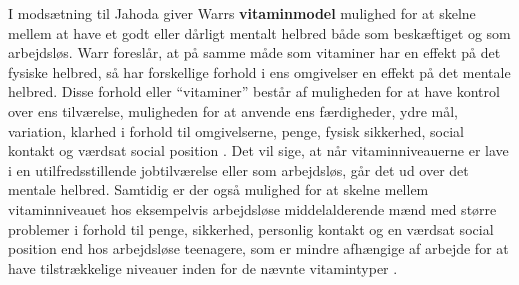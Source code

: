 I modsætning til Jahoda giver Warrs \textbf{vitaminmodel} mulighed for at skelne mellem at have et godt eller dårligt mentalt helbred både som beskæftiget og som arbejdsløs. Warr foreslår, at på samme måde som vitaminer har en effekt på det fysiske helbred, så har forskellige forhold i ens omgivelser en effekt på det mentale helbred. Disse forhold eller “vitaminer” består af muligheden for at have kontrol over ens tilværelse, muligheden for at anvende ens færdigheder, ydre mål, variation, klarhed i forhold til omgivelserne, penge, fysisk sikkerhed, social kontakt og værdsat social position \parencite[45]{Ezzy1993}. Det vil sige, at når vitaminniveauerne er lave i en utilfredsstillende jobtilværelse eller som arbejdsløs, går det ud over det mentale helbred. Samtidig er der også mulighed for at skelne mellem vitaminniveauet hos eksempelvis arbejdsløse middelalderende mænd med større problemer i forhold til penge, sikkerhed, personlig kontakt og en værdsat social position end hos arbejdsløse teenagere, som er mindre afhængige af arbejde for at have tilstrækkelige niveauer inden for de nævnte vitamintyper \parencite[46]{Ezzy1993}.

